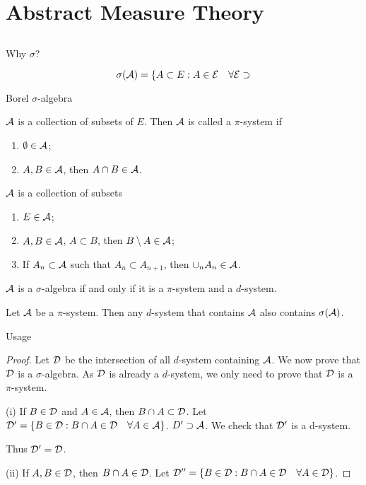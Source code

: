\chapter{Abstract Measure Theory}


\section{}
Why $\sigma$?


\begin{definition}
    \[\sigma(\mathcal{A})=\{A\subset E:A\in\mathcal{E} \quad \forall \mathcal{E} \supset \]
\end{definition}
\begin{remark}
    Borel $\sigma$-algebra
\end{remark}

\begin{definition}[$\pi$-system]
    $\mathcal{A}$ is a collection of subsets of $E$. Then $\mathcal{A}$ is called a $\pi$-system if 
    \begin{enumerate}
        \item $\emptyset\in\mathcal{A}$;
        \item $A,B\in\mathcal{A}$, then $A\cap B\in\mathcal{A}$.
    \end{enumerate}
\end{definition}

\begin{definition}[$d$-system]
    $\mathcal{A}$ is a collection of subsets 
    \begin{enumerate}
        \item $E\in\mathcal{A}$;
        \item $A,B\in\mathcal{A}$, $A\subset B$, then $B\setminus A \in\mathcal{A}$;
        \item If $A_n\subset \mathcal{A}$ such that $A_n\subset A_{n+1}$, then $\cup_{n}A_n\in\mathcal{A}$.
    \end{enumerate}
\end{definition}

\begin{proposition}
    $\mathcal{A}$ is a $\sigma$-algebra if and only if it is a $\pi$-system and a $d$-system.
\end{proposition}

\begin{lemma}
    Let $\mathcal{A}$ be a $\pi$-system. Then any $d$-system that contains $\mathcal{A}$ also contains $\sigma(\mathcal{A})$.
\end{lemma}
Usage
\begin{proof}
    Let $\mathcal{D}$ be the intersection of all $d$-system containing $\mathcal{A}$.
    We now prove that $\mathcal{D}$ is a $\sigma$-algebra. As $\mathcal{D}$ is already a $d$-system, we only need to prove that $\mathcal{D}$ is a $\pi$-system.

    (i) If $B\in\mathcal{D}$ and $A\in\mathcal{A}$, then $B\cap A\subset\mathcal{D}$.
    Let $\mathcal{D}'=\{B\in\mathcal{D}:B\cap A\in \mathcal{D}\quad \forall A\in\mathcal{A}\}$. $D'\supset \mathcal{A}$. We check that $\mathcal{D}'$ is a d-system.

    Thus $\mathcal{D}'=\mathcal{D}$.

    (ii) If $A,B\in\mathcal{D}$, then $B\cap A\in\mathcal{D}$.
    Let $\mathcal{D}''=\{B\in\mathcal{D}:B\cap A\in \mathcal{D}\quad \forall A\in\mathcal{D}\}$.
\end{proof}






